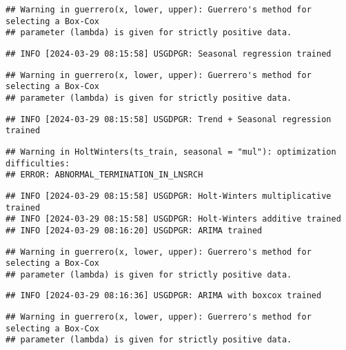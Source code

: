 \documentclass[
]{article}
\begin{document}
\begin{verbatim}
## Warning in guerrero(x, lower, upper): Guerrero's method for selecting a Box-Cox
## parameter (lambda) is given for strictly positive data.
\end{verbatim}

\begin{verbatim}
## INFO [2024-03-29 08:15:58] USGDPGR: Seasonal regression trained
\end{verbatim}

\begin{verbatim}
## Warning in guerrero(x, lower, upper): Guerrero's method for selecting a Box-Cox
## parameter (lambda) is given for strictly positive data.
\end{verbatim}

\begin{verbatim}
## INFO [2024-03-29 08:15:58] USGDPGR: Trend + Seasonal regression trained
\end{verbatim}

\begin{verbatim}
## Warning in HoltWinters(ts_train, seasonal = "mul"): optimization difficulties:
## ERROR: ABNORMAL_TERMINATION_IN_LNSRCH
\end{verbatim}

\begin{verbatim}
## INFO [2024-03-29 08:15:58] USGDPGR: Holt-Winters multiplicative trained
## INFO [2024-03-29 08:15:58] USGDPGR: Holt-Winters additive trained
## INFO [2024-03-29 08:16:20] USGDPGR: ARIMA trained
\end{verbatim}

\begin{verbatim}
## Warning in guerrero(x, lower, upper): Guerrero's method for selecting a Box-Cox
## parameter (lambda) is given for strictly positive data.
\end{verbatim}

\begin{verbatim}
## INFO [2024-03-29 08:16:36] USGDPGR: ARIMA with boxcox trained
\end{verbatim}

\begin{verbatim}
## Warning in guerrero(x, lower, upper): Guerrero's method for selecting a Box-Cox
## parameter (lambda) is given for strictly positive data.
\end{verbatim}
\end{document}
